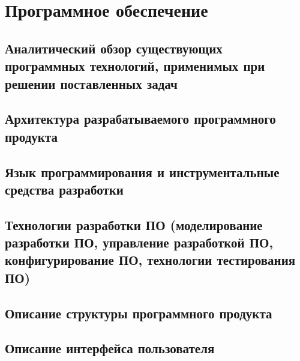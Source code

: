 \newpage
\section{Программное обеспечение}

\subsection{Аналитический обзор существующих программных технологий, применимых при решении поставленных задач}
\subsection{Архитектура разрабатываемого программного продукта}
\subsection{Язык программирования и инструментальные средства разработки}
\subsection{Технологии разработки ПО (моделирование разработки ПО, управление разработкой ПО, конфигурирование ПО, технологии тестирования ПО)}
\subsection{Описание структуры программного продукта}
\subsection{Описание интерфейса пользователя}

